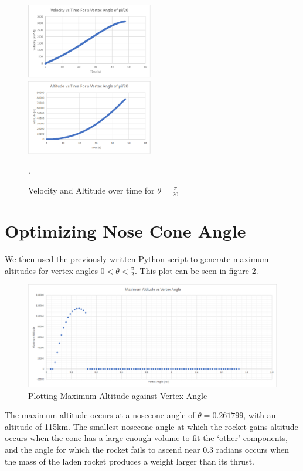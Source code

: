 \documentclass[]{article}
\begin{document}
\begin{figure}[h]
	\centering
	\includegraphics[width=0.495\textwidth]{velocity.png}
	\includegraphics[width=0.495\textwidth]{altitude}
	\caption{Velocity and Altitude over time for $\theta = \frac{\pi}{20}$}.
	\label{velalt}
\end{figure}


\section{Optimizing Nose Cone Angle}

We then used the previously-written Python script to generate maximum altitudes for vertex angles $0<\theta<\frac{\pi}{2}$. This plot can be seen in figure \ref{optimization}.

\begin{figure}[h]
	\begin{center}
		\caption{Plotting Maximum Altitude against Vertex Angle}
		\label{optimization}
		\includegraphics[scale=0.5]{optimization.png}
	\end{center}
\end{figure}

The maximum altitude occurs at a nosecone angle of $\theta = 0.261799$, with an altitude of 115km. The smallest nosecone angle at which the rocket gains altitude occurs when the cone has a large enough volume to fit the `other' components, and the angle for which the rocket fails to ascend near 0.3 radians occurs when the mass of the laden rocket produces a weight larger than its thrust.
\end{document}
